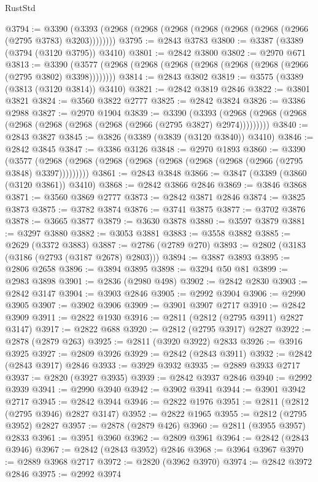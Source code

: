\begin{lexlean}{RustStd}
\begin{coremodule}
{\begin{coremodule}
{{{{{{{{{{{{{{{{{{{{{{{{{{{{{{{{{@3794 := @3390 (@3393 (@2968 (@2968 (@2968 (@2968 (@2968 (@2968 (@2966 (@2795 @3783) @3203))))))))
@3795 := @2843 @3783
@3800 := @3387 (@3389 (@3794 (@3120 @3795)) @3410)
@3801 := @2842 @3800
@3802 := @2970 @671
@3813 := @3390 (@3577 (@2968 (@2968 (@2968 (@2968 (@2968 (@2968 (@2966 (@2795 @3802) @3398))))))))
@3814 := @2843 @3802
@3819 := @3575 (@3389 (@3813 (@3120 @3814)) @3410)
@3821 := @2842 @3819 @2846
@3822 := @3801 @3821
@3824 := @3560 @3822 @2777
@3825 := @2842 @3824
@3826 := @3386 @2988
@3827 := @2970 @1904
@3839 := @3390
    (@3393 (@2968 (@2968 (@2968 (@2968 (@2968 (@2968 (@2968 (@2966 (@2795 @3827) @2974)))))))))
@3840 := @2843 @3827
@3845 := @3826 (@3389 (@3839 (@3120 @3840)) @3410)
@3846 := @2842 @3845
@3847 := @3386 @3126
@3848 := @2970 @1893
@3860 := @3390
    (@3577 (@2968 (@2968 (@2968 (@2968 (@2968 (@2968 (@2968 (@2966 (@2795 @3848) @3397)))))))))
@3861 := @2843 @3848
@3866 := @3847 (@3389 (@3860 (@3120 @3861)) @3410)
@3868 := @2842 @3866 @2846
@3869 := @3846 @3868
@3871 := @3560 @3869 @2777
@3873 := @2842 @3871 @2846
@3874 := @3825 @3873
@3875 := @3782 @3874
@3876 := @3741 @3875
@3877 := @3702 @3876
@3878 := @3665 @3877
@3879 := @3630 @3878
@3880 := @3597 @3879
@3881 := @3297 @3880
@3882 := @3053 @3881
@3883 := @3558 @3882
@3885 := @2629 (@3372 @3883)
@3887 := @2786 (@2789 @270)
@3893 := @2802 (@3183 (@3186 (@2793 (@3187 @2678) @2803)))
@3894 := @3887 @3893
@3895 := @2806 @2658
@3896 := @3894 @3895
@3898 := @3294 @50 @81
@3899 := @2983 @3898
@3901 := @2836 (@2980 @498)
@3902 := @2842 @2830
@3903 := @2842 @3147
@3904 := @3903 @2846
@3905 := @2992 @3904
@3906 := @2990 @3905
@3907 := @3902 @3906
@3909 := @3901 @3907 @2717
@3910 := @2842 @3909
@3911 := @2822 @1930
@3916 := @2811 (@2812 (@2795 @3911) @2827 @3147)
@3917 := @2822 @688
@3920 := @2812 (@2795 @3917) @2827
@3922 := @2878 (@2879 @263)
@3925 := @2811 (@3920 @3922) @2833
@3926 := @3916 @3925
@3927 := @2809 @3926
@3929 := @2842 (@2843 @3911)
@3932 := @2842 (@2843 @3917) @2846
@3933 := @3929 @3932
@3935 := @2889 @3933 @2717
@3937 := @2820 (@3927 @3935)
@3939 := @2842 @3937 @2846
@3940 := @2992 @3939
@3941 := @2990 @3940
@3942 := @3902 @3941
@3944 := @3901 @3942 @2717
@3945 := @2842 @3944
@3946 := @2822 @1976
@3951 := @2811 (@2812 (@2795 @3946) @2827 @3147)
@3952 := @2822 @1965
@3955 := @2812 (@2795 @3952) @2827
@3957 := @2878 (@2879 @426)
@3960 := @2811 (@3955 @3957) @2833
@3961 := @3951 @3960
@3962 := @2809 @3961
@3964 := @2842 (@2843 @3946)
@3967 := @2842 (@2843 @3952) @2846
@3968 := @3964 @3967
@3970 := @2889 @3968 @2717
@3972 := @2820 (@3962 @3970)
@3974 := @2842 @3972 @2846
@3975 := @2992 @3974
}}}}}}}}}}}}}}}}}}}}}}}}}}}}}}}}}
\end{coremodule}}
\end{coremodule}
\end{lexlean}
